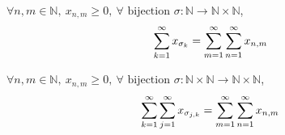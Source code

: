 	\begin{theorem}
		$\forall n,m \in \mathbb{N},\ x_{n,m} \ge 0,\ \forall \text{ bijection }\sigma : \mathbb{N} \to \mathbb{N}\times\mathbb{N}$, $$\series{x_{\sigma_k}}{k} = \doubleseries{x_{n,m}}{m}{n}$$
	\end{theorem}

	\begin{corollary}
		$\forall n,m \in \mathbb{N},\ x_{n,m} \ge 0,\ \forall \text{ bijection }\sigma : \mathbb{N}\times\mathbb{N} \to \mathbb{N}\times\mathbb{N}$, $$\doubleseries{x_{\sigma_{j,k}}}{k}{j} = \doubleseries{x_{n,m}}{m}{n}$$
	\end{corollary}
